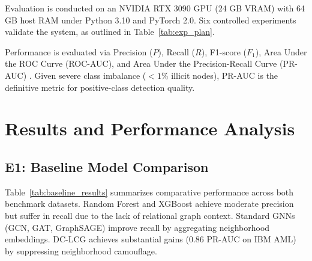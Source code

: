 \documentclass[journal]{IEEEtran}
\begin{document}
Evaluation is conducted on an NVIDIA RTX 3090 GPU (24 GB VRAM) with 64 GB host RAM under Python 3.10 and PyTorch 2.0. Six controlled experiments validate the system, as outlined in Table~\ref{tab:exp_plan}.

\begin{table}[t]
\centering
\caption{Comprehensive Controlled Experimental Suite}
\label{tab:exp_plan}
\end{table}

Performance is evaluated via Precision ($P$), Recall ($R$), F1-score ($F_1$), Area Under the ROC Curve (ROC-AUC), and Area Under the Precision-Recall Curve (PR-AUC) \cite{saito2015precision}. Given severe class imbalance ($<1\%$ illicit nodes), PR-AUC is the definitive metric for positive-class detection quality.

\section{Results and Performance Analysis}
\label{sec:results}

\subsection{E1: Baseline Model Comparison}
Table~\ref{tab:baseline_results} summarizes comparative performance across both benchmark datasets. Random Forest and XGBoost achieve moderate precision but suffer in recall due to the lack of relational graph context. Standard GNNs (GCN, GAT, GraphSAGE) improve recall by aggregating neighborhood embeddings. DC-LCG achieves substantial gains (0.86 PR-AUC on IBM AML) by suppressing neighborhood camouflage. 
\end{document}
